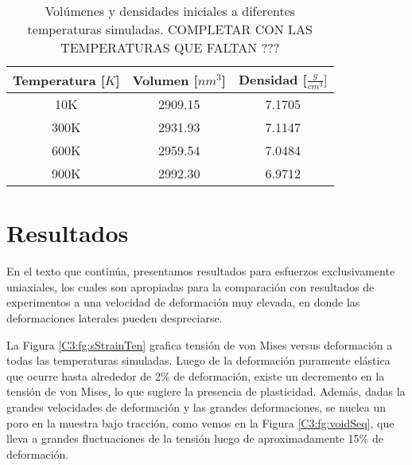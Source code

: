 
\begin{table}[htp]
\caption[Volúmenes y densidades iniciales.]{Volúmenes y densidades iniciales a diferentes temperaturas simuladas. COMPLETAR CON LAS TEMPERATURAS QUE FALTAN ???}
\begin{center}
\begin{tabular}{*{3}{c}}
\hline
Temperatura [$K$] & Volumen [$nm^{3}$] & Densidad [$\frac{g}{cm^{3}}]$ \\ \hline \hline
10K & 2909.15 & 7.1705 \\ \hline
300K & 2931.93 & 7.1147 \\ \hline
600K & 2959.54 & 7.0484 \\ \hline
900K & 2992.30 & 6.9712 \\ \hline
\end{tabular}
\end{center}
\label{C3:tb:initprops}
\end{table}

\section{Resultados}
\label{S3_3}

En el texto que continúa, presentamos resultados para esfuerzos exclusivamente uniaxiales, los cuales son apropiadas para la comparación con resultados de experimentos a una velocidad de deformación muy elevada, en donde las deformaciones laterales pueden despreciarse. 

La Figura \ref{C3:fg:sStrainTen} grafica tensión de von Mises versus deformación a todas las temperaturas simuladas. Luego de la deformación puramente elástica que ocurre hasta alrededor de 2\% de deformación, existe un decremento en la tensión de von Mises, lo que sugiere la presencia de plasticidad. Además, dadas la grandes velocidades de deformación y las grandes deformaciones, se nuclea un poro en la muestra bajo tracción, como vemos en la Figura \ref{C3:fg:voidSeq}, que lleva a grandes fluctuaciones de la tensión luego de aproximadamente 15\% de deformación.

